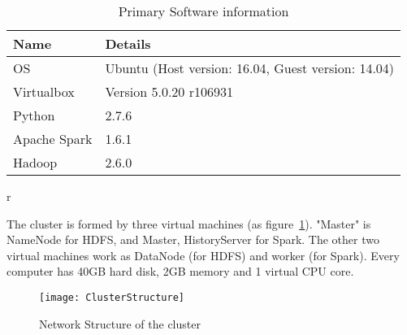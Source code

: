 \begin{table}[h]
	\centering
	\begin{tabular}{|l|l|}
		\hline
		\textbf{Name} & \textbf{Details} \\ \hline
		OS & Ubuntu (Host version: 16.04, Guest version: 14.04) \\ \hline
		Virtualbox & Version 5.0.20 r106931 \\ \hline
		Python & 2.7.6 \\ \hline
		Apache Spark & 1.6.1 \\ \hline
		Hadoop & 2.6.0 \\ \hline
	\end{tabular}r
	\caption{Primary Software information}
	\label{tb:softwareList}
\end{table}
The cluster is formed by three virtual machines (as figure~\ref{fg:clustur}). "Master" is NameNode for HDFS, and Master, HistoryServer for Spark. The other two virtual machines work as DataNode (for HDFS) and worker (for Spark). Every computer has 40GB hard disk, 2GB memory and 1 virtual CPU core.
\begin{figure}[h]
	\centering
	\texttt{[image: ClusterStructure]}
	\caption{Network Structure of the cluster}
	\label{fg:clustur}
\end{figure}
